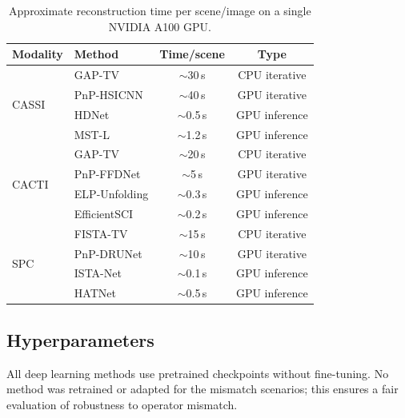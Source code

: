 \documentclass[runningheads]{llncs}
\begin{document}
\begin{table}[h]
\centering
\caption{Approximate reconstruction time per scene/image on a single NVIDIA A100 GPU.}
\label{tab:runtime}
\begin{tabular}{@{}llcc@{}}
\toprule
\textbf{Modality} & \textbf{Method} & \textbf{Time/scene} & \textbf{Type} \\
\midrule
\multirow{4}{*}{CASSI} & GAP-TV & $\sim$30\,s & CPU iterative \\
& PnP-HSICNN & $\sim$40\,s & GPU iterative \\
& HDNet & $\sim$0.5\,s & GPU inference \\
& MST-L & $\sim$1.2\,s & GPU inference \\
\midrule
\multirow{4}{*}{CACTI} & GAP-TV & $\sim$20\,s & CPU iterative \\
& PnP-FFDNet & $\sim$5\,s & GPU iterative \\
& ELP-Unfolding & $\sim$0.3\,s & GPU inference \\
& EfficientSCI & $\sim$0.2\,s & GPU inference \\
\midrule
\multirow{4}{*}{SPC} & FISTA-TV & $\sim$15\,s & CPU iterative \\
& PnP-DRUNet & $\sim$10\,s & GPU iterative \\
& ISTA-Net & $\sim$0.1\,s & GPU inference \\
& HATNet & $\sim$0.5\,s & GPU inference \\
\bottomrule
\end{tabular}
\end{table}

\subsection{Hyperparameters}

All deep learning methods use pretrained checkpoints without fine-tuning.
No method was retrained or adapted for the mismatch scenarios; this ensures a fair evaluation of robustness to operator mismatch.
\end{document}
